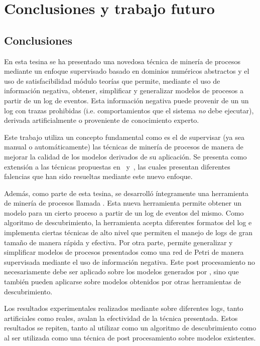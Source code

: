 \chapter{Conclusiones y trabajo futuro}
\label{chap:5}

\section*{Conclusiones}

En esta tesina se ha presentado una novedosa técnica de minería de procesos mediante un enfoque
supervisado basado en dominios numéricos abstractos y el uso de satisfacibilidad 
módulo teorías que permite, mediante el uso de información negativa, obtener, simplificar y
generalizar modelos de procesos a partir de un log de eventos. Esta información negativa puede provenir 
de un un log con trazas prohibidas (i.e. comportamientos que el sistema \emph{no} debe ejecutar),
derivada artificialmente o proveniente de conocimiento experto.

Este trabajo utiliza un concepto fundamental como es el de supervisar (ya sea manual o automáticamente)
las técnicas de minería de procesos de manera de mejorar la calidad de los modelos derivados de
su aplicación. Se presenta como extensión a las técnicas propuestas en~\cite{CarmonaC14}
y~\cite{LeonCB15}, las cuales presentan diferentes falencias que han sido resueltas mediante
este nuevo enfoque.

Además, como parte de esta tesina, se desarrolló íntegramente una herramienta de
minería de procesos llamada \pachtool.
Esta nueva herramienta %
permite obtener un modelo para un cierto proceso a partir de un log de eventos del mismo.
Como algoritmo de descubrimiento, la herramienta acepta diferentes formatos del log 
e implementa ciertas técnicas de alto nivel que permiten el manejo de logs de gran 
tamaño de manera rápida y efectiva.
Por otra parte, \pachtool permite generalizar y simplificar modelos de procesos presentados como
una red de Petri de manera supervisada mediante el uso de información negativa. Este 
post procesamiento no necesariamente debe ser aplicado sobre los modelos generados por \pachtool,
sino que también pueden aplicarse sobre modelos obtenidos por otras herramientas de descubrimiento.

Los resultados experimentales realizados mediante \pachtool sobre diferentes logs, tanto 
artificiales como reales, avalan la efectividad de la técnica presentada.
Estos resultados se repiten, tanto al utilizar \pachtool como un algoritmo de descubrimiento 
como al ser utilizada como una técnica de post procesamiento sobre modelos existentes.

